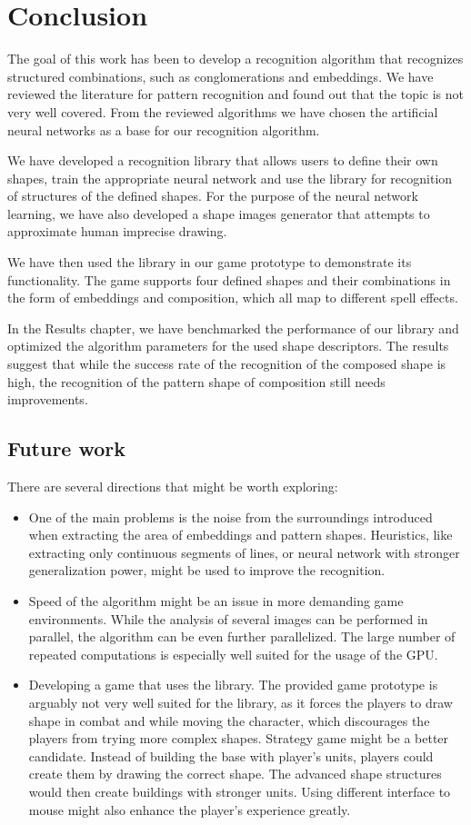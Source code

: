 \chapter*{Conclusion}
The goal of this work has been to develop a recognition algorithm that recognizes structured combinations, such as conglomerations and embeddings. We have reviewed the literature for pattern recognition and found out that the topic is not very well covered. From the reviewed algorithms we have chosen the artificial neural networks as a base for our recognition algorithm. 

We have developed a recognition library that allows users to define their own shapes, train the appropriate neural network and use the library for recognition of structures of the defined shapes. For the purpose of the neural network learning, we have also developed a shape images generator that attempts to approximate human imprecise drawing.

We have then used the library in our game prototype to demonstrate its functionality. The game supports four defined shapes and their combinations in the form of embeddings and composition, which all map to different spell effects. 

In the Results chapter, we have benchmarked the performance of our library and optimized the algorithm parameters for the used shape descriptors. The results suggest that while the success rate of the recognition of the composed shape is high, the recognition of the pattern shape of composition still needs improvements.

\section{Future work}
There are several directions that might be worth exploring:
\begin{itemize}
\item One of the main problems is the noise from the surroundings introduced when extracting the area of embeddings and pattern shapes. Heuristics, like extracting only continuous segments of lines, or neural network with stronger generalization power, might be used to improve the recognition.

\item Speed of the algorithm might be an issue in more demanding game environments. While the analysis of several images can be performed in parallel, the algorithm can be even further parallelized. The large number of repeated computations is especially well suited for the usage of the GPU.

\item Developing a game that uses the library. The provided game prototype is arguably not very well suited for the library, as it forces the players to draw shape in combat and while moving the character, which discourages the players from trying more complex shapes.
Strategy game might be a better candidate. Instead of building the base with player's units, players could create them by drawing the correct shape. The advanced shape structures would then create buildings with stronger units.
Using different interface to mouse might also enhance the player's experience greatly.

\end{itemize}
